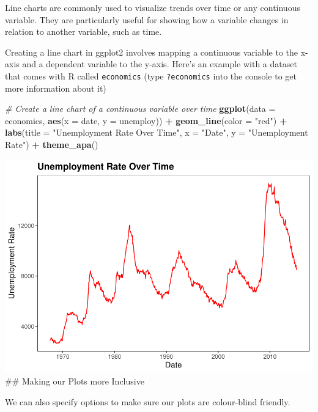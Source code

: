 \documentclass[
]{book}
\newenvironment{Shaded}{\begin{snugshade}}{\end{snugshade}}
\newcommand{\AttributeTok}[1]{\textcolor[rgb]{0.13,0.29,0.53}{#1}}
\newcommand{\CommentTok}[1]{\textcolor[rgb]{0.56,0.35,0.01}{\textit{#1}}}
\newcommand{\FunctionTok}[1]{\textcolor[rgb]{0.13,0.29,0.53}{\textbf{#1}}}
\newcommand{\NormalTok}[1]{#1}
\newcommand{\SpecialCharTok}[1]{\textcolor[rgb]{0.81,0.36,0.00}{\textbf{#1}}}
\newcommand{\StringTok}[1]{\textcolor[rgb]{0.31,0.60,0.02}{#1}}
\begin{document}
Line charts are commonly used to visualize trends over time or any continuous variable. They are particularly useful for showing how a variable changes in relation to another variable, such as time.

Creating a line chart in ggplot2 involves mapping a continuous variable to the x-axis and a dependent variable to the y-axis. Here's an example with a dataset that comes with R called \texttt{economics} (type \texttt{?economics} into the console to get more information about it)

\begin{Shaded}
\begin{Highlighting}[]
\CommentTok{\# Create a line chart of a continuous variable over time}
\FunctionTok{ggplot}\NormalTok{(}\AttributeTok{data =}\NormalTok{ economics, }\FunctionTok{aes}\NormalTok{(}\AttributeTok{x =}\NormalTok{ date, }\AttributeTok{y =}\NormalTok{ unemploy)) }\SpecialCharTok{+}
  \FunctionTok{geom\_line}\NormalTok{(}\AttributeTok{color =} \StringTok{"red"}\NormalTok{) }\SpecialCharTok{+}
  \FunctionTok{labs}\NormalTok{(}\AttributeTok{title =} \StringTok{"Unemployment Rate Over Time"}\NormalTok{, }\AttributeTok{x =} \StringTok{"Date"}\NormalTok{, }\AttributeTok{y =} \StringTok{"Unemployment Rate"}\NormalTok{) }\SpecialCharTok{+}
  \FunctionTok{theme\_apa}\NormalTok{()}
\end{Highlighting}
\end{Shaded}

\includegraphics{rintro_demo_files/figure-latex/unnamed-chunk-327-1.pdf}
\#\# Making our Plots more Inclusive

We can also specify options to make sure our plots are colour-blind friendly.
\end{document}

